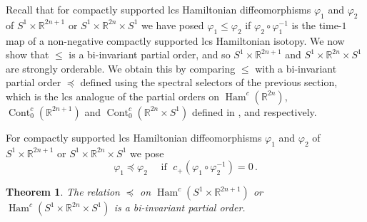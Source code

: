 \documentclass{amsart}
\DeclareMathOperator{\Ham}{Ham}
\DeclareMathOperator{\Cont}{Cont}
\newtheorem{thm}{Theorem}[section]
\theoremstyle{remark}
\begin{document}
Recall that for compactly supported lcs Hamiltonian diffeomorphisms
$\varphi_1$ and $\varphi_2$ of $S^1 \times \mathbb{R}^{2n+1}$
or $S^1 \times \mathbb{R}^{2n} \times S^1$
we have posed $\varphi_1 \leq \varphi_2$
if $\varphi_2 \circ \varphi_1^{-1}$ is the time-$1$ map
of a non-negative compactly supported lcs Hamiltonian isotopy.
We now show that $\leq$ is a bi-invariant partial order,
and so $S^1 \times \mathbb{R}^{2n+1}$ and $S^1 \times \mathbb{R}^{2n} \times S^1$
are strongly orderable.
We obtain this by comparing $\leq$
with a bi-invariant partial order $\preceq$
defined using the spectral selectors of the previous section,
which is the lcs analogue
of the partial orders on $\Ham^c (\mathbb{R}^{2n})$,
$\Cont_0^c (\mathbb{R}^{2n+1})$ and $\Cont_0^c (\mathbb{R}^{2n} \times S^1)$
defined in \cite{Viterbo},
\cite{Bhupal} and \cite{San11} respectively.

For compactly supported lcs Hamiltonian diffeomorphisms
$\varphi_1$ and $\varphi_2$ of $S^1 \times \mathbb{R}^{2n+1}$
or $S^1 \times \mathbb{R}^{2n} \times S^1$
we pose
\[
\varphi_1 \preceq \varphi_2 \quad \text{ if } \;
c_+ (\varphi_1 \circ \varphi_2^{-1}) = 0 \,.
\]

\begin{thm}\label{theorem: po 1}
The relation $\preceq$ on $\Ham^c (S^1 \times \mathbb{R}^{2n+1})$
or $\Ham^c (S^1 \times \mathbb{R}^{2n} \times S^1)$
is a bi-invariant partial order.
\end{thm}
\end{document}
